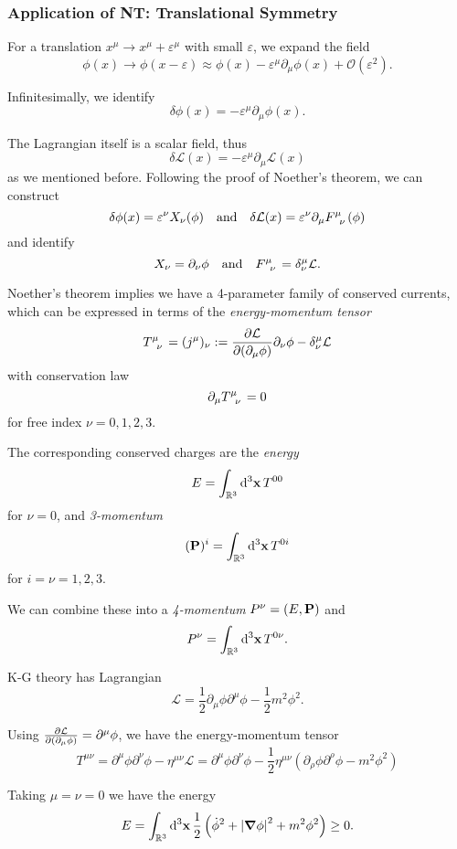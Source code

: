 \documentclass[a4paper,11pt]{article}
\begin{document}
	\subsubsection{Application of NT: Translational Symmetry} 

	For a translation $x^\mu \to x^\mu + \varepsilon^\mu$ with small $\varepsilon$, we expand the field 
	\[
		\phi(x) \to \phi(x - \varepsilon) \approx \phi(x) - \varepsilon^\mu \partial_\mu \phi(x) + \mathcal{O}(\varepsilon^2).
	\]
	
	Infinitesimally, we identify 
	\[
		\delta \phi(x) = - \varepsilon^\mu \partial_\mu \phi(x).
	\]
	
	The Lagrangian itself is a scalar field, thus 
	\[
		\delta \mathcal{L}(x) = - \varepsilon^\mu \partial_\mu \mathcal{L}(x)
	\]
	as we mentioned before. Following the proof of Noether's theorem, we can construct 
	\[
		\delta \phi(x) = \varepsilon^\nu X_\nu (\phi) \quad \text{and} \quad \delta \mathcal{L} (x) = \varepsilon^\nu \partial_\mu F\indices{^\mu_\nu}(\phi)
	\]
	and identify
	\[
		X_\nu = \partial_\nu \phi \quad \text{and} \quad F\indices{^\mu_\nu} = \delta^\mu_\nu \mathcal{L}.
	\]
	
	Noether's theorem implies we have a 4-parameter family of conserved currents, which can be expressed in terms of the \emph{energy-momentum tensor}
	\begin{equation}
		T\indices{^\mu_\nu} = (j^\mu)_\nu := \pdv{\mathcal{L}}{(\partial_\mu \phi)} \partial_\nu \phi - \delta^\mu_\nu \mathcal{L}
		\label{eq:1.7.6}
	\end{equation}
	with conservation law
	\[
		\partial_\mu T\indices{^\mu_\nu} = 0
	\]
	for free index $\nu = 0,1,2,3$.

	The corresponding conserved charges are the \emph{energy}
	\[
		E = \int _{\mathbb{R}^3} \dd[3]{\vb x} T ^{00}
	\]
	for $\nu = 0$, and \emph{3-momentum}
	\[
		(\vb P)^i = \int _{\mathbb{R}^3} \dd[3]{\vb x} T ^{0i}
	\]
	for $i = \nu = 1,2,3$.

	We can combine these into a \emph{4-momentum} $P^\nu = (E, \vb P)$ and
	\[
		P^\nu = \int _{\mathbb{R}^3} \dd[3]{\vb x} T ^{0 \nu}.
	\]
	
	\begin{ex}
		K-G theory has Lagrangian
		\[
			\mathcal{L} = \frac{1}{2} \partial_\mu \phi \partial^\mu \phi - \frac{1}{2} m^2 \phi^2.
		\]
		
		Using $\pdv{\mathcal{L}}{(\partial_\mu \phi)} = \partial^\mu \phi$, we have the energy-momentum tensor
		\[
			T ^{\mu \nu} = \partial^\mu \phi \partial^\nu \phi - \eta ^{\mu \nu} \mathcal{L} = \partial^\mu \phi \partial^\nu \phi - \frac{1}{2}\eta ^{\mu \nu} \left( \partial_\rho \phi \partial^\rho \phi -  m^2 \phi^2 \right)
		\]
		
		Taking $\mu = \nu = 0$ we have the energy
		\[
			E = \int _{\mathbb{R}^3} \dd[3]{\vb x} \frac{1}{2} \left(\dot{\phi}^2 + \abs{\grad \phi}^2 +  m^2 \phi^2 \right)  \geq 0.
		\]
	\end{ex}
\end{document}
